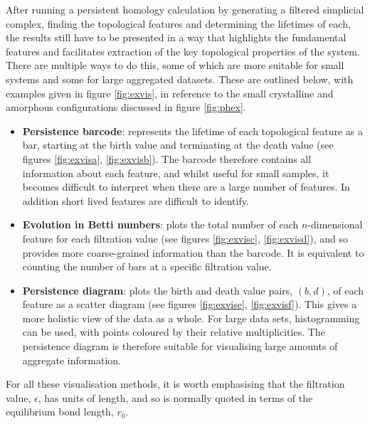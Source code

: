 After running a persistent homology calculation by generating a filtered simplicial complex, finding the topological features and determining the lifetimes of each, the results still have to be presented in a way that highlights the fundamental features and facilitates extraction of the key topological properties of the system.
There are multiple ways to do this, some of which are more suitable for small systems and some for large aggregated datasets.
These are outlined below, with examples given in figure \ref{fig:exvis}, in reference to the small crystalline and amorphous configurations discussed in figure \ref{fig:phex}.
\begin{itemize}
	\item \textbf{Persistence barcode}: represents the lifetime of each topological feature as a bar, starting at the birth value and terminating at the death value (see figures \ref{fig:exvisa}, \ref{fig:exvisb}). The barcode therefore contains all information about each feature, and whilst useful for small samples, it becomes difficult to interpret when there are a large number of features. In addition short lived features are difficult to identify.
	
	\item \textbf{Evolution in Betti numbers}: plots the total number of each $n$\--dimensional feature for each filtration value (see figures \ref{fig:exvisc}, \ref{fig:exvisd}), and so provides more coarse\--grained information than the barcode. It is equivalent to counting the number of bars at a specific filtration value.
	
	\item \textbf{Persistence diagram}: plots the birth and death value pairs, $\left(b,d\right)$, of each feature as a scatter diagram (see figures \ref{fig:exvise}, \ref{fig:exvisf}). This gives a more holistic view of the data as a whole. For large data sets, histogramming can be used, with points coloured by their relative multiplicities. The persistence diagram is therefore suitable for visualising large amounts of aggregate information.
	
\end{itemize}
For all these visualisation methods, it is worth emphasising that the filtration value, $\epsilon$, has units of length, and so is normally quoted in terms of the equilibrium bond length, $r_0$. 

